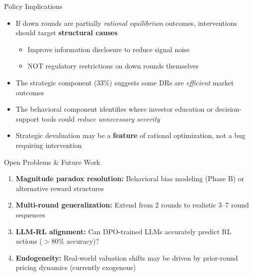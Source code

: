 \documentclass[aspectratio=169]{beamer}
\begin{document}
\begin{frame}{Policy Implications}
  \begin{itemize}
    \item If down rounds are partially \emph{rational equilibrium} outcomes, interventions should target \textbf{structural causes}
      \begin{itemize}
        \item Improve information disclosure to reduce signal noise
        \item NOT regulatory restrictions on down rounds themselves
      \end{itemize}
    \item The strategic component (33\%) suggests some DRs are \emph{efficient} market outcomes
    \item The behavioral component identifies where investor education or decision-support tools could \emph{reduce unnecessary severity}
    \item Strategic devaluation may be a \textbf{feature} of rational optimization, not a bug requiring intervention
  \end{itemize}
\end{frame}

\begin{frame}{Open Problems \& Future Work}
  \begin{enumerate}
    \item \textbf{Magnitude paradox resolution:} Behavioral bias modeling (Phase B) or alternative reward structures
    \item \textbf{Multi-round generalization:} Extend from 2 rounds to realistic 3--7 round sequences
    \item \textbf{LLM-RL alignment:} Can DPO-trained LLMs accurately predict RL actions ($>80\%$ accuracy)?
    \item \textbf{Endogeneity:} Real-world valuation shifts may be driven by prior-round pricing dynamics (currently exogenous)
  \end{enumerate}

  \vspace{0.3cm}
  \begin{center}
  \end{center}
\end{frame}
\end{document}
